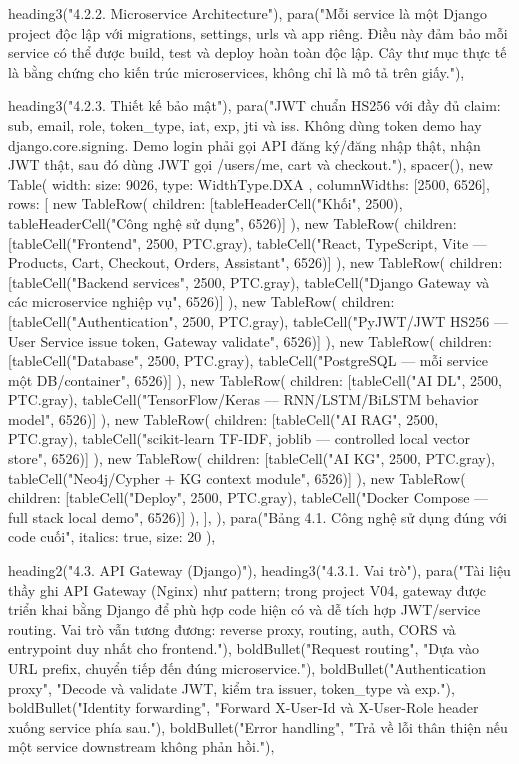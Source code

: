 {{{  heading3("4.2.2. Microservice Architecture"),
  para("Mỗi service là một Django project độc lập với migrations, settings, urls và app riêng. Điều này đảm bảo mỗi service có thể được build, test và deploy hoàn toàn độc lập. Cây thư mục thực tế là bằng chứng cho kiến trúc microservices, không chỉ là mô tả trên giấy."),

  heading3("4.2.3. Thiết kế bảo mật"),
  para("JWT chuẩn HS256 với đầy đủ claim: sub, email, role, token_type, iat, exp, jti và iss. Không dùng token demo hay django.core.signing. Demo login phải gọi API đăng ký/đăng nhập thật, nhận JWT thật, sau đó dùng JWT gọi /users/me, cart và checkout."),
  spacer(),
  new Table({
    width: { size: 9026, type: WidthType.DXA },
    columnWidths: [2500, 6526],
    rows: [
      new TableRow({ children: [tableHeaderCell("Khối", 2500), tableHeaderCell("Công nghệ sử dụng", 6526)] }),
      new TableRow({ children: [tableCell("Frontend", 2500, PTC.gray), tableCell("React, TypeScript, Vite — Products, Cart, Checkout, Orders, Assistant", 6526)] }),
      new TableRow({ children: [tableCell("Backend services", 2500, PTC.gray), tableCell("Django Gateway và các microservice nghiệp vụ", 6526)] }),
      new TableRow({ children: [tableCell("Authentication", 2500, PTC.gray), tableCell("PyJWT/JWT HS256 — User Service issue token, Gateway validate", 6526)] }),
      new TableRow({ children: [tableCell("Database", 2500, PTC.gray), tableCell("PostgreSQL — mỗi service một DB/container", 6526)] }),
      new TableRow({ children: [tableCell("AI DL", 2500, PTC.gray), tableCell("TensorFlow/Keras — RNN/LSTM/BiLSTM behavior model", 6526)] }),
      new TableRow({ children: [tableCell("AI RAG", 2500, PTC.gray), tableCell("scikit-learn TF-IDF, joblib — controlled local vector store", 6526)] }),
      new TableRow({ children: [tableCell("AI KG", 2500, PTC.gray), tableCell("Neo4j/Cypher + KG context module", 6526)] }),
      new TableRow({ children: [tableCell("Deploy", 2500, PTC.gray), tableCell("Docker Compose — full stack local demo", 6526)] }),
    ],
  }),
  para("Bảng 4.1. Công nghệ sử dụng đúng với code cuối", { italics: true, size: 20 }),

  heading2("4.3. API Gateway (Django)"),
  heading3("4.3.1. Vai trò"),
  para("Tài liệu thầy ghi API Gateway (Nginx) như pattern; trong project V04, gateway được triển khai bằng Django để phù hợp code hiện có và dễ tích hợp JWT/service routing. Vai trò vẫn tương đương: reverse proxy, routing, auth, CORS và entrypoint duy nhất cho frontend."),
  boldBullet("Request routing", "Dựa vào URL prefix, chuyển tiếp đến đúng microservice."),
  boldBullet("Authentication proxy", "Decode và validate JWT, kiểm tra issuer, token_type và exp."),
  boldBullet("Identity forwarding", "Forward X-User-Id và X-User-Role header xuống service phía sau."),
  boldBullet("Error handling", "Trả về lỗi thân thiện nếu một service downstream không phản hồi."),

}}}
